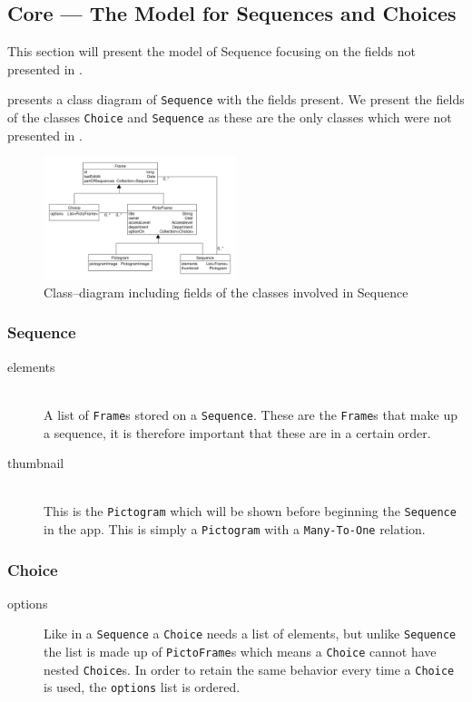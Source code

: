 \subsection{Core --- The Model for Sequences and Choices}\label{subsec:seqcore}
This section will present the model of Sequence focusing on the fields not presented in .

 presents a class diagram of \texttt{Sequence} with the fields present.
We present the fields of the classes \texttt{Choice} and \texttt{Sequence} as these are the only classes which were not presented in .

\begin{figure}[h]
    \centering
    \includegraphics[width=0.5\textwidth]{figures/sequencemodel.pdf}
    \caption{Class--diagram including fields of the classes involved in Sequence}\label{fig:sequencemodel}
\end{figure}

\subsubsection{Sequence}
\begin{description}
	\item[elements] \hfill \\
    A list of \texttt{Frame}s stored on a \texttt{Sequence}.
	These are the \texttt{Frame}s that make up a sequence, it is therefore important that these are in a certain order.
	\item[thumbnail] \hfill \\
    This is the \texttt{Pictogram} which will be shown before beginning the \texttt{Sequence} in the app.
	This is simply a \texttt{Pictogram} with a \texttt{Many-To-One} relation.
\end{description}

\subsubsection{Choice}
\begin{description}
	\item[options] Like in a \texttt{Sequence} a \texttt{Choice} needs a list of elements, but unlike \texttt{Sequence} the list is made up of \texttt{PictoFrame}s which means a \texttt{Choice} cannot have nested \texttt{Choice}s.
    In order to retain the same behavior every time a \texttt{Choice} is used, the \texttt{options} list is ordered.
\end{description}
